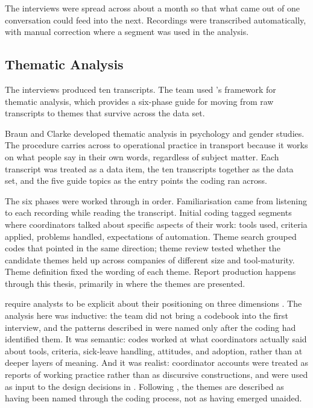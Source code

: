 The interviews were spread across about a month so that what came out of one conversation could feed into the next. Recordings were transcribed automatically, with manual correction where a segment was used in the analysis.

\subsection{Thematic Analysis}
\label{sec:thematic-analysis}

The interviews produced ten transcripts. The team used \textcite{braun2006thematic}'s framework for thematic analysis, which provides a six-phase guide for moving from raw transcripts to themes that survive across the data set.

Braun and Clarke developed thematic analysis in psychology and gender studies. The procedure carries across to operational practice in transport because it works on what people say in their own words, regardless of subject matter. Each transcript was treated as a data item, the ten transcripts together as the data set, and the five guide topics as the entry points the coding ran across.

The six phases were worked through in order. Familiarisation came from listening to each recording while reading the transcript. Initial coding tagged segments where coordinators talked about specific aspects of their work: tools used, criteria applied, problems handled, expectations of automation. Theme search grouped codes that pointed in the same direction; theme review tested whether the candidate themes held up across companies of different size and tool-maturity. Theme definition fixed the wording of each theme. Report production happens through this thesis, primarily in  where the themes are presented.

\textcite{braun2006thematic} require analysts to be explicit about their positioning on three dimensions \parencite[pp.~81--82]{braun2006thematic}. The analysis here was inductive: the team did not bring a codebook into the first interview, and the patterns described in  were named only after the coding had identified them. It was semantic: codes worked at what coordinators actually said about tools, criteria, sick-leave handling, attitudes, and adoption, rather than at deeper layers of meaning. And it was realist: coordinator accounts were treated as reports of working practice rather than as discursive constructions, and were used as input to the design decisions in . Following \textcite[Table~2]{braun2006thematic}, the themes are described as having been named through the coding process, not as having emerged unaided.

